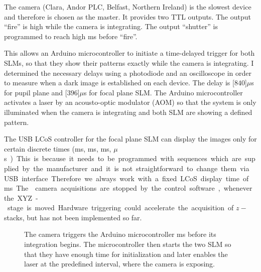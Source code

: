 The camera (Clara, Andor PLC, Belfast, Northern Ireland) is the
 slowest device and therefore is chosen as the
master. It provides two TTL outputs. The output ``fire'' is high while
the camera is integrating. The output ``shutter'' is programmed to reach
high \unit[1]{ms} before ``fire''.

This allows an Arduino microcontroller to initiate a time-delayed
trigger for both SLMs, so that they show their patterns exactly while
the camera is integrating. I determined the necessary delays using a
photodiode and an oscilloscope in order to measure when a dark image
is established on each device. The delay is \unit[$840$]{$\mu$s} for
pupil plane and \unit[$396$]{$\mu$s} for focal plane SLM. The Arduino
microcontroller activates a laser by an acousto-optic modulator (AOM)
so that the system is only illuminated when the camera is integrating
and both SLM are showing a defined pattern.  



The  USB LCoS controller for the
focal plane SLM can display the images only for certain discrete times
(\unit[20]{ms}, \unit[10]{ms}, \unit[5]{ms}, \unit[200]{$\mu$s}).
This is because it needs to be programmed with sequences which are
supplied by the manufacturer and it is not straightforward to change
them via USB interface. Therefore we always work with a fixed LCoS
display time of \unit[20]{ms}.

The  camera acquisitions are stopped
by the control software, whenever the XYZ-stage is moved. Hardware
triggering could accelerate the acquisition of $z-$stacks, but has not
been implemented so far.

\begin{figure}[H]
 \centering
 \caption{The camera triggers the Arduino microcontroller \unit[1]{ms}
   before its integration begins. The microcontroller then starts the
   two SLM so that they have enough time for initialization and later
   enables the laser at the predefined interval, where the camera is
   exposing.}
 \label{fig:memi-electronics}
\end{figure}






